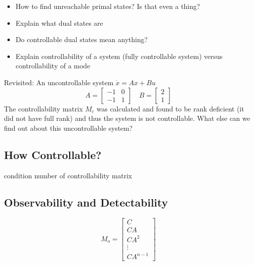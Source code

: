 \begin{itemize}
  \item{How to find unreachable primal states? Is that even a thing?}
  \item{Explain what dual states are}
  \item{Do controllable dual states mean anything?}
  \item{Explain controllability of a system (fully controllable system) versus controllability of a mode}
\end{itemize}

\begin{example}
  Revisited: An uncontrollable system $\dot{x}=Ax+Bu$
  \begin{equation*}
    A=
    \left[
      \begin{array}{cc}
        -1 & 0 \\
        -1 & 1
      \end{array}
    \right]
    \quad B=
    \left[
      \begin{array}{c}
        2 \\
        1
      \end{array}
    \right]
  \end{equation*}
  The controllability matrix $M_{c}$ was calculated and found to be rank deficient (it did not have full rank) and thus the system is not controllable.
  What else can we find out about this uncontrollable system?
\end{example}

\subsection{How Controllable?}

condition number of controllability matrix

\subsection{Observability and Detectability}

\begin{equation*}
M_{o}=
\left[
  \begin{array}{c}
    C \\ CA \\ CA^{2} \\ \vdots \\ CA^{n-1}
  \end{array}
\right]
\end{equation*}

